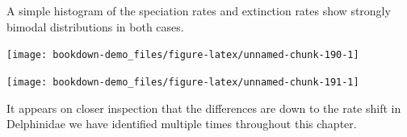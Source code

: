 \documentclass[
]{book}
\newenvironment{Shaded}{\begin{snugshade}}{\end{snugshade}}
\newcommand{\DataTypeTok}[1]{\textcolor[rgb]{0.13,0.29,0.53}{#1}}
\newcommand{\KeywordTok}[1]{\textcolor[rgb]{0.13,0.29,0.53}{\textbf{#1}}}
\newcommand{\NormalTok}[1]{#1}
\newcommand{\OperatorTok}[1]{\textcolor[rgb]{0.81,0.36,0.00}{\textbf{#1}}}
\newcommand{\StringTok}[1]{\textcolor[rgb]{0.31,0.60,0.02}{#1}}
\begin{document}
A simple histogram of the speciation rates and extinction rates show strongly bimodal distributions in both cases.

\begin{Shaded}
\end{Shaded}

\begin{center}\texttt{[image: bookdown-demo\_files/figure-latex/unnamed-chunk-190-1]} \end{center}

\begin{Shaded}
\end{Shaded}

\begin{center}\texttt{[image: bookdown-demo\_files/figure-latex/unnamed-chunk-191-1]} \end{center}

It appears on closer inspection that the differences are down to the rate shift in Delphinidae we have identified multiple times throughout this chapter.
\end{document}
